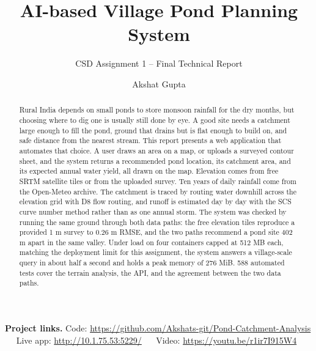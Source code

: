 \documentclass[manuscript,screen,review]{acmart}
\begin{document}
\title{AI-based Village Pond Planning System}
\subtitle{CSD Assignment 1 -- Final Technical Report}

\author{Akshat Gupta}

\renewcommand{\shortauthors}{Gupta}

\begin{abstract}
Rural India depends on small ponds to store monsoon rainfall for the dry months, but
choosing where to dig one is usually still done by eye. A good site needs a catchment
large enough to fill the pond, ground that drains but is flat enough to build on, and
safe distance from the nearest stream. This report presents a web application that
automates that choice. A user draws an area on a map, or uploads a surveyed contour
sheet, and the system returns a recommended pond location, its catchment area, and its
expected annual water yield, all drawn on the map. Elevation comes from free SRTM
satellite tiles or from the uploaded survey. Ten years of daily rainfall come from the
Open-Meteo archive. The catchment is traced by routing water downhill across the
elevation grid with D8 flow routing, and runoff is estimated day by day with the SCS
curve number method rather than as one annual storm. The system was checked by running
the same ground through both data paths: the free elevation tiles reproduce a provided
1 m survey to 0.26 m RMSE, and the two paths recommend a pond site 402 m apart in the
same valley. Under load on four containers capped at 512 MB each, matching the
deployment limit for this assignment, the system answers a village-scale query in
about half a second and holds a peak memory of 276 MiB. 588 automated tests cover the
terrain analysis, the API, and the agreement between the two data paths.
\end{abstract}


\maketitle

\begingroup\footnotesize\noindent
\textbf{Project links.} Code: \url{https://github.com/Akshats-git/Pond-Catchment-Analysis} ~~
Live app: \url{http://10.1.75.53:5229/} ~~
Video: \url{https://youtu.be/r1ir7I915W4}
\endgroup
\par\smallskip
\end{document}
